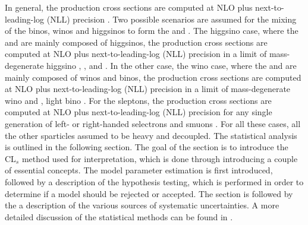 In general, the production cross sections are computed at NLO plus next-to-leading-log (NLL) precision \cite{Kulesza:2008jb, Kulesza:2009kq,Borschensky:2014cia}.
Two possible scenarios are assumed for the mixing of the binos, winos and higgsinos to form the \firstcharg and \secondchi. 
The higgsino case, where the \firstcharg and \secondchi are mainly composed of higgsinos, the production cross sections are computed at NLO plus next-to-leading-log (NLL) precision in a limit of mass-degenerate higgsino \firstcharg, \secondchi, and \firstchi \cite{Beenakker:1999xh,Fuks:2012qx, Fuks:2013vua}. 
In the other case, the wino case, where the \firstcharg and \secondchi are mainly composed of winos and binos, the production cross sections are computed at NLO plus next-to-leading-log (NLL) precision in a limit of mass-degenerate wino \secondchi and \firstcharg, light bino \firstchi \cite{Beenakker:1999xh, Fuks:2012qx, Fuks:2013vua}. 
For the sleptons, the production cross sections are computed at NLO plus next-to-leading-log (NLL) precision for any single generation of left- or right-handed selectrons and smuons \cite{Beenakker:1999xh, Fuks:2013lya}. 
For all these cases, all the other sparticles assumed to be heavy and decoupled.
\newpara
\noindent\justify
The statistical analysis is outlined in the following section. 
The goal of the section is to introduce the $\mathrm{CL}_{s}$ method used for interpretation, which is done through introducing a couple of essential concepts. 
The model parameter estimation is first introduced, followed by a description of the hypothesis testing, which is performed in order to determine if a model should be rejected or accepted.
The section is followed by the a description of the various sources of systematic uncertainties. 
A more detailed discussion of the statistical methods can be found in \cite{Lista:2016chp}. 
